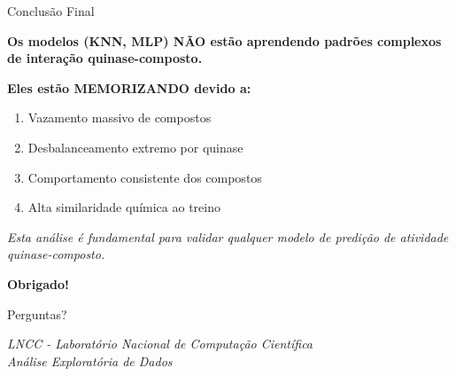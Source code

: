 \documentclass[aspectratio=169,11pt]{beamer}
\begin{document}
\begin{frame}{Conclusão Final}
    \begin{center}
        \Large
        \textcolor{lnccblue}{\textbf{Os modelos (KNN, MLP) NÃO estão aprendendo padrões complexos de interação quinase-composto.}}

        \vspace{1cm}

        \textcolor{alertred}{\textbf{Eles estão MEMORIZANDO devido a:}}

        \vspace{0.5cm}
        \begin{enumerate}
            \item Vazamento massivo de compostos
            \item Desbalanceamento extremo por quinase
            \item Comportamento consistente dos compostos
            \item Alta similaridade química ao treino
        \end{enumerate}

        \vspace{1cm}
        \textit{Esta análise é fundamental para validar qualquer modelo de predição de atividade quinase-composto.}
    \end{center}
\end{frame}

\begin{frame}
    \begin{center}
        \Huge\textcolor{lnccblue}{\textbf{Obrigado!}}

        \vspace{1cm}
        \Large
        Perguntas?

        \vspace{1.5cm}
        \normalsize
        \textit{LNCC - Laboratório Nacional de Computação Científica}\\
        \textit{Análise Exploratória de Dados}
    \end{center}
\end{frame}
\end{document}
